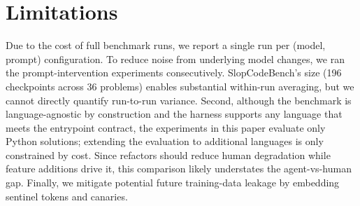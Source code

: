 \section{Limitations}
\label{sec:limitations}

Due to the cost of full benchmark runs, we report a single run per (model, prompt) configuration. To reduce noise from underlying model changes, we ran the prompt-intervention experiments consecutively. SlopCodeBench's size (196 checkpoints across 36 problems) enables substantial within-run averaging, but we cannot directly quantify run-to-run variance. Second, although the benchmark is language-agnostic by construction and the harness supports any language that meets the entrypoint contract, the experiments in this paper evaluate only Python solutions; extending the evaluation to additional languages is only constrained by cost. Since refactors should reduce human degradation while feature additions drive it, this comparison likely understates the agent-vs-human gap. Finally, we mitigate potential future training-data leakage by embedding sentinel tokens and canaries.
